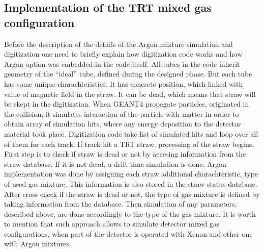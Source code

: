 \subsection{Implementation of the TRT mixed gas configuration}
Before the description of the details of the Argon mixture simulation and digitization one need to briefly explain how digitization code works and how Argon option was embedded in the code itself.
All tubes in the code inherit geometry of the ``ideal'' tube, defined during the designed phase. But each tube has some unique charachteristics. It has concrete position, 
which linked with value of magnetic field in the straw. It can be dead, which means that straw will be skept in the digitization.
When GEANT4 propagate particles, originated in the collision, it simulates interaction of the particle with matter in order to obtain array of simulation hits, where any energy deposition to the 
detector material took place. Digitization code take list of simulated hits and loop over all of them for each track. If track hit a TRT straw, processing of the straw begins.
First step is to check if straw is dead or not by accesing information from the straw database.
If it is not dead, a drift time simulation is done.
Argon implementation was done by assigning each straw additional charachteristic, type of used gas mixture. This information is also stored in the straw status database.
After cross check if the straw is dead or not, the type of gas mixture is defined by taking information from the database.
Then simulation of any parameters, described above, are done accordingly to the type of the gas mixture.
It is worth to mention that such approach allows to simulate detector mixed gas configurations, when part of the detector is operated with Xenon and other one with Argon mixtures.

